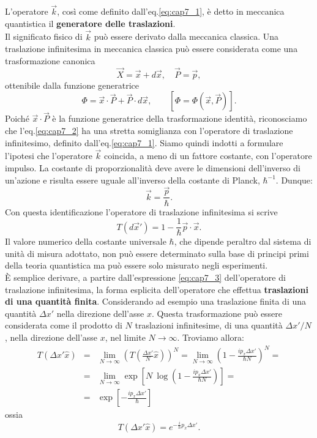 L'operatore $\vec{k}$, così come definito dall'eq.\eqref{eq:cap7_1}, è detto in meccanica quantistica il \textbf{generatore delle traslazioni}.\\
Il significato fisico di $\vec{k}$ può essere derivato dalla meccanica classica. Una traslazione infinitesima in meccanica classica può essere considerata come una trasformazione canonica
\begin{equation}
\vec{X}= \vec{x}+ d\vec{x}, \quad \vec{P}= \vec{p} ,
\end{equation}
ottenibile dalla funzione generatrice
\begin{equation}
\label{eq:cap7_2}
\Phi = \vec{x}\cdot \vec{P}+\vec{P}\cdot d\vec{x} ,\qquad\left[\Phi=\Phi ( \vec{x}, \vec{P} ) \right].
\end{equation}
Poiché $\vec{x} \cdot \vec{P}$ è la funzione generatrice della trasformazione identità, riconosciamo che l'eq.\eqref{eq:cap7_2} ha una stretta somiglianza con l'operatore di traslazione infinitesimo, definito dall'eq.\eqref{eq:cap7_1}. Siamo quindi indotti a  formulare l'ipotesi che l'operatore $\vec{k}$ coincida, a meno di un fattore costante, con l'operatore impulso. La costante di proporzionalità deve avere le dimensioni dell'inverso di un'azione e risulta essere uguale all'inverso della costante di Planck, $\hbar ^{-1}$. Dunque:
\begin{equation}
\vec{k}=\frac{\vec{p}}{\hbar}.
\end{equation}
Con questa identificazione l'operatore di traslazione infinitesima si scrive
\begin{equation}
\label{eq:cap7_3}
T(d\vec{x}') = 1-\frac{1}{\hbar}\vec{p}\cdot\vec{x}.
\end{equation}
Il valore numerico della costante universale $\hbar$, che dipende peraltro dal sistema di unità di misura adottato, non può essere determinato sulla base di principi primi della teoria quantistica ma può essere solo misurato negli esperimenti. \\
È semplice derivare, a partire dall'espressione \eqref{eq:cap7_3} dell'operatore di traslazione infinitesima, la forma esplicita dell'operatore che effettua \textbf{traslazioni di una quantità finita}. Considerando ad esempio una traslazione finita di una quantità $\Delta x '$ nella direzione dell'asse $x$. Questa trasformazione può essere considerata come il prodotto di $N$ traslazioni infinitesime, di una quantità $\Delta x ' / N$, nella direzione dell'asse $x$, nel limite $N\rightarrow \infty $. Troviamo allora:
\begin{eqnarray}
T(\Delta x'\hat{x}) & = & \lim _{N\rightarrow \infty} \left(T \left( \frac{\Delta x'}{N}\hat{x} \right) \right) ^N = \lim _{N\rightarrow \infty} \left( 1- \frac{i p_x \Delta x'}{\hbar N} \right) ^N =\nonumber \\
&=& \lim _{N\rightarrow \infty} \exp \left[N\ \log \left(1- \frac{i p_x \Delta x'}{\hbar N}  \right) \right] = \nonumber \\
&=& \exp \left[  -\frac{i p_x \Delta x'}{\hbar}  \right] 
\end{eqnarray}
ossia
\begin{equation}
T(\Delta x'\hat{x}) = e^{-\frac{i}{\hbar} p_x \Delta x' }.
\end{equation}
